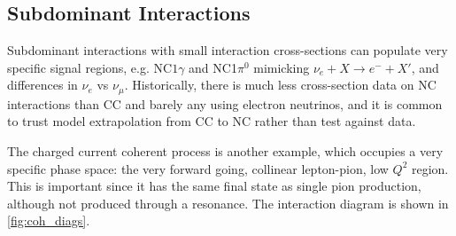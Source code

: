 \subsection{Subdominant Interactions}
Subdominant interactions with small interaction cross-sections can populate very specific signal regions, e.g. NC$1\gamma$ and NC1$\pi^0$ mimicking $\nu_e + X\rightarrow e^- + X'$, and differences in $\nu_e$ vs $\nu_\mu$. Historically, there is much less cross-section data on NC interactions than CC and barely any using electron neutrinos, and it is common to trust model extrapolation from CC to NC rather than test against data. 

The charged current coherent process is another example, which occupies a very specific phase space: the very forward going, collinear lepton-pion, low $Q^2$ region. This is important since it has the same final state as single pion production, although not produced through a resonance. The interaction diagram is shown in \autoref{fig:coh_diags}.
